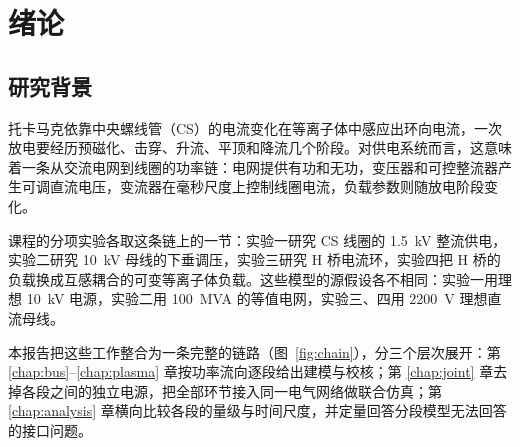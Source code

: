 
\chapter{绪论}
\label{chap:intro}

\section{研究背景}

托卡马克依靠中央螺线管（CS）的电流变化在等离子体中感应出环向电流，一次放电要经历预磁化、击穿、升流、平顶和降流几个阶段\cite{wesson2011tokamaks}。对供电系统而言，这意味着一条从交流电网到线圈的功率链：电网提供有功和无功，变压器和可控整流器产生可调直流电压，变流器在毫秒尺度上控制线圈电流，负载参数则随放电阶段变化。

课程的分项实验各取这条链上的一节：实验一研究 CS 线圈的 1.5~kV 整流供电\cite{guide-cs}，实验二研究 10~kV 母线的下垂调压\cite{guide-droop}，实验三研究 H 桥电流环\cite{guide-hbridge}，实验四把 H 桥的负载换成互感耦合的可变等离子体负载\cite{guide-plasma}。这些模型的源假设各不相同：实验一用理想 10~kV 电源，实验二用 100~MVA 的等值电网，实验三、四用 2200~V 理想直流母线。

本报告把这些工作整合为一条完整的链路（图~\ref{fig:chain}），分三个层次展开：第 \ref{chap:bus}--\ref{chap:plasma} 章按功率流向逐段给出建模与校核；第 \ref{chap:joint} 章去掉各段之间的独立电源，把全部环节接入同一电气网络做联合仿真；第 \ref{chap:analysis} 章横向比较各段的量级与时间尺度，并定量回答分段模型无法回答的接口问题。

